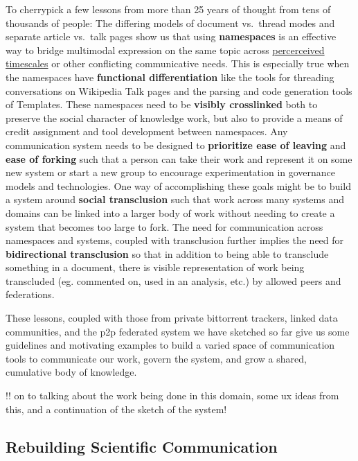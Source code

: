 \documentclass[notoc]{tufte-book}
\begin{document}
To cherrypick a few lessons from more than 25 years of thought from tens
of thousands of people: The differing models of document vs.~thread
modes and separate article vs.~talk pages show us that using
\textbf{namespaces} is an effective way to bridge multimodal expression
on the same topic across
\href{https://communitywiki.org/wiki/TimeInWikis}{percerceived
timescales} or other conflicting communicative needs. This is especially
true when the namespaces have \textbf{functional differentiation} like
the tools for threading conversations on Wikipedia Talk pages and the
parsing and code generation tools of Templates. These namespaces need to
be \textbf{visibly crosslinked} both to preserve the social character of
knowledge work, but also to provide a means of credit assignment and
tool development between namespaces. Any communication system needs to
be designed to \textbf{prioritize ease of leaving} and \textbf{ease of
forking} such that a person can take their work and represent it on some
new system or start a new group to encourage experimentation in
governance models and technologies. One way of accomplishing these goals
might be to build a system around \textbf{social transclusion} such that
work across many systems and domains can be linked into a larger body of
work without needing to create a system that becomes too large to fork.
The need for communication across namespaces and systems, coupled with
transclusion further implies the need for \textbf{bidirectional
transclusion} so that in addition to being able to transclude something
in a document, there is visible representation of work being transcluded
(eg. commented on, used in an analysis, etc.) by allowed peers and
federations.

These lessons, coupled with those from private bittorrent trackers,
linked data communities, and the p2p federated system we have sketched
so far give us some guidelines and motivating examples to build a varied
space of communication tools to communicate our work, govern the system,
and grow a shared, cumulative body of knowledge.

!! on to talking about the work being done in this domain, some ux ideas
from this, and a continuation of the sketch of the system!






\subsection{Rebuilding Scientific
Communication}
\end{document}
